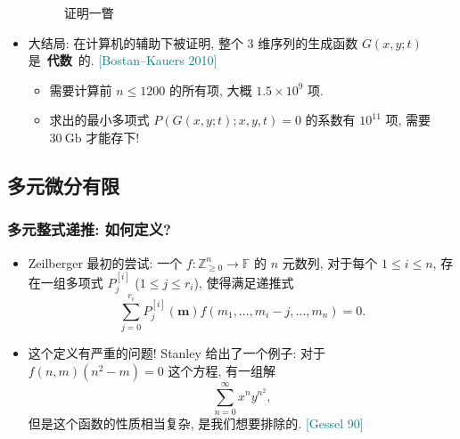 \documentclass{ctexbeamer}
\newcommand{\cnote}[2][\footnotesize]{\textcolor{teal}{#1[#2]}}
\newcommand{\bbF}{\mathbb F}
\newcommand{\bbZ}{\mathbb Z}
\begin{document}
\begin{frame}
\begin{itemize}
{\begin{figure}
        \caption{证明一瞥}
      \end{figure}
    }
    \item<5-> 大结局: 在计算机的辅助下被证明, 整个 $3$ 维序列的生成函数 $G(x,y;t)$ 是~\textbf{代数}~的. \cnote{Bostan--Kauers 2010}
    \begin{itemize}
      \item 需要计算前 $n\leq 1200$ 的所有项, 大概 $1.5\times 10^9$ 项.
      \item 求出的最小多项式 $P(G(x, y; t); x, y, t) = 0$ 的系数有 $10^{11}$ 项, 需要 $30~\mathrm{Gb}$ 才能存下!
    \end{itemize}
  \end{itemize}

\end{frame}

\subsection{多元微分有限}

\begin{frame}
  \frametitle{多元整式递推: 如何定义?}

  \begin{itemize}
    \item Zeilberger 最初的尝试: 一个 $f\colon \bbZ_{\geq0}^n \to \bbF$ 的 $n$ 元数列, 对于每个 $1\leq i\leq n$,
    存在一组多项式 $P^{[i]}_j$ ($1\leq j\leq r_i$), 使得满足递推式
    \begin{equation}
      \sum_{j=0}^{r_i} P^{[i]}_j(\bm{m}) f(m_1,\dots,m_i-j,\dots,m_n) = 0.
    \end{equation}
    \pause
    \item 这个定义有严重的问题! Stanley 给出了一个例子: 对于 $f(n, m)(n^2-m) = 0$ 这个方程, 有一组解
    \begin{equation}
      \sum_{n=0}^\infty x^ny^{n^2},
    \end{equation}
    但是这个函数的性质相当复杂, 是我们想要排除的. \cnote{Gessel 90}
  \end{itemize}

\end{frame}
\end{document}
